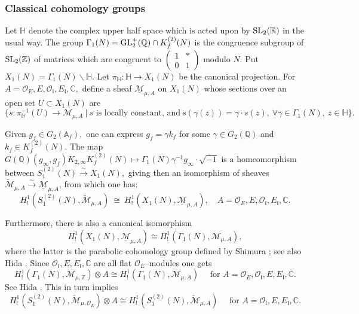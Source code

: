 \documentclass[11pt]{amsart}
\newcommand{\Z}{\mathbb Z}
\newcommand{\congf}[1]{K_f^{(2)}(#1)}
\begin{document}
\subsubsection{Classical cohomology groups}
 Let $\mathbb{H}$ denote the complex upper half space which is acted upon by ${\rm SL_2}(\mathbb{R})$ in the usual way. 
The group $\Gamma_1(N) = {\rm GL}_2^+(\mathbb{Q}) \cap \congf{N}$ is the congruence subgroup of 
${\rm SL}_2(\Z)$ of matrices which are congruent to $\left(\begin{smallmatrix} 1 & * \\ 0 & 1 \end{smallmatrix}\right)$ modulo $N.$
Put $X_1(N) = \Gamma_1(N) \backslash \mathbb{H}.$ Let $\pi_{\mathbb{H}}: \mathbb{H} \rightarrow X_1(N)$ be the canonical projection. 
For $A = \mathcal{O}_E, E, \mathcal{O}_\mathfrak{l}, E_\mathfrak{l}, \mathbb{C},$ 
define a sheaf $\underline{\mathcal{M}}_{\mu, A}$ on $X_1(N)$ whose sections over an open set $U \subset X_1({N})$ are 
$$
\{ s:\pi_{\mathbb{H}}^{-1}(U) \rightarrow \mathcal{M}_{\mu,A} \ | \ s \text{ is locally constant, and} \ 
s(\gamma( z)) = \gamma \cdot s(z), \ \forall \gamma \in \Gamma_1({N}), \ z\in \mathbb{H}\}.
$$

Given $g_f \in G_2(\mathbb{A}_f),$ one can express $g_f = \gamma k_f$ for some $\gamma \in G_2(\mathbb{Q})$ and $k_f \in \congf{N}.$ 
The map $G(\mathbb{Q})(g_\infty, g_f)K_{2, \infty}\congf{N} \mapsto \Gamma_1(N) \gamma^{-1}g_\infty\cdot \sqrt{-1}$ 
is a homeomorphism between $S_1^{(2)}(N) \xrightarrow{\sim} X_1(N),$ giving then an isomorphism of sheaves 
$\widetilde{\mathcal{M}}_{\mu,A} \xrightarrow{\sim} \underline{\mathcal{M}}_{\mu,A}$, from which one has:
$$
H^1_!(S^{(2)}_1(N), \widetilde{\mathcal{M}}_{\mu,A}) \ \cong \ H^1_!(X_1(N), \underline{\mathcal{M}}_{\mu,A}), \quad 
A = \mathcal{O}_E, E, \mathcal{O}_\mathfrak{l}, E_\mathfrak{l}, \mathbb{C}.
$$ 

Furthermore, there is also a canonical isomorphism 
$$
H_!^1(X_1(N), \underline{\mathcal{M}}_{\mu,A}) \cong H_!^1(\Gamma_1(N), \mathcal{M}_{\mu,A}),
$$
where the latter is the parabolic cohomology group defined by Shimura \cite[Chap.\,8]{iataf}; see also Hida \cite[Appendix]{lfe}. 
Since $\mathcal{O}_\mathfrak{l}, E, E_\mathfrak{l}, \mathbb{C}$ are all flat $\mathcal{O}_E$--modules one gets
\begin{equation*}
	H_!^1(\Gamma_1(N), \mathcal{M}_{\mu,\Z})\otimes A \cong H_!^1(\Gamma_1(N), \mathcal{M}_{\mu,A})\quad \text{ for } A = \mathcal{O}_E, \mathcal{O}_\mathfrak{l}, E, E_\mathfrak{l}, \mathbb{C}.
\end{equation*}
See Hida \cite[p.\,168]{lfe}. This in turn implies
\begin{equation}
H_!^1(S_1^{(2)}(N), \widetilde{\mathcal{M}}_{\mu,\mathcal{O}_E}) \otimes A \cong	
H_!^1(S_1^{(2)}(N), \widetilde{\mathcal{M}}_{\mu,A}) \quad \text{ for } A = 
\mathcal{O}_\mathfrak{l}, E, E_\mathfrak{l}, \mathbb{C}. 
\label{eqn: functorial-properties-of-cohomology-groups}
\end{equation}
\end{document}
